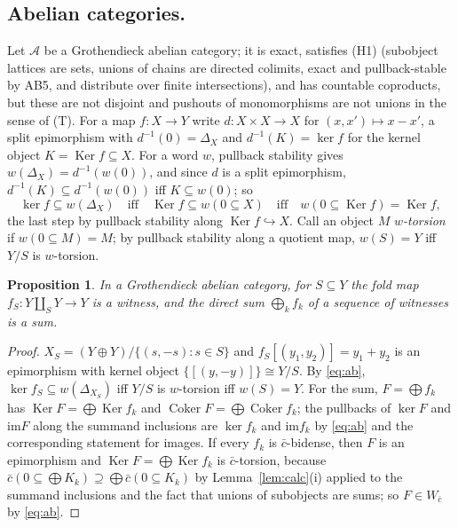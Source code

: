 \documentclass[11pt]{amsart}
\newtheorem{prop}[thm]{Proposition}
\theoremstyle{definition}
\newcommand{\im}{\mathrm{im}}
\begin{document}
\subsection*{Abelian categories.}
Let $\mathcal A$ be a Grothendieck abelian category; it is exact, satisfies
(H1) (subobject lattices are sets, unions of chains are directed colimits,
exact and pullback-stable by AB5, and distribute over finite intersections),
and has countable coproducts, but these are not disjoint and pushouts of
monomorphisms are not unions in the sense of (T). For a map $f\colon X\to Y$
write $d\colon X\times X\to X$ for $(x,x')\mapsto x-x'$, a split epimorphism
with $d^{-1}(0)=\Delta_X$ and $d^{-1}(K)=\ker f$ for the kernel object
$K=\operatorname{Ker}f\subseteq X$. For a word $w$, pullback stability gives
$w(\Delta_X)=d^{-1}(w(0))$, and since $d$ is a split epimorphism,
$d^{-1}(K)\subseteq d^{-1}(w(0))$ iff $K\subseteq w(0)$; so
\begin{equation}\label{eq:ab}
\ker f\subseteq w(\Delta_X)\quad\text{iff}\quad\operatorname{Ker}f\subseteq
w(0\subseteq X)\quad\text{iff}\quad w(0\subseteq\operatorname{Ker}f)=
\operatorname{Ker}f,
\end{equation}
the last step by pullback stability along $\operatorname{Ker}f\hookrightarrow
X$. Call an object $M$ \emph{$w$-torsion} if $w(0\subseteq M)=M$; by
pullback stability along a quotient map, $w(S)=Y$ iff $Y/S$ is $w$-torsion.

\begin{prop}\label{prop:witnessA}
In a Grothendieck abelian category, for $S\subseteq Y$ the fold map
$f_S\colon Y\amalg_SY\to Y$ is a witness, and the direct sum $\bigoplus_kf_k$
of a sequence of witnesses is a sum.
\end{prop}
\begin{proof}
$X_S=(Y\oplus Y)/\{(s,-s):s\in S\}$ and $f_S[(y_1,y_2)]=y_1+y_2$ is an
epimorphism with kernel object $\{[(y,-y)]\}\cong Y/S$. By \eqref{eq:ab},
$\ker f_S\subseteq w(\Delta_{X_S})$ iff $Y/S$ is $w$-torsion iff $w(S)=Y$. For
the sum, $F=\bigoplus f_k$ has $\operatorname{Ker}F=\bigoplus\operatorname{Ker}
f_k$ and $\operatorname{Coker}F=\bigoplus\operatorname{Coker}f_k$; the
pullbacks of $\ker F$ and $\im F$ along the summand inclusions are
$\ker f_k$ and $\im f_k$ by \eqref{eq:ab} and the corresponding statement
for images. If every $f_k$ is $\bar c$-bidense, then $F$ is an epimorphism
and $\operatorname{Ker}F=\bigoplus\operatorname{Ker}f_k$ is $\bar c$-torsion,
because $\bar c(0\subseteq\bigoplus K_k)\supseteq\bigoplus\bar c(0\subseteq
K_k)$ by Lemma~\ref{lem:calc}(i) applied to the summand inclusions and the
fact that unions of subobjects are sums; so $F\in W_{\bar c}$ by
\eqref{eq:ab}.
\end{proof}
\end{document}
